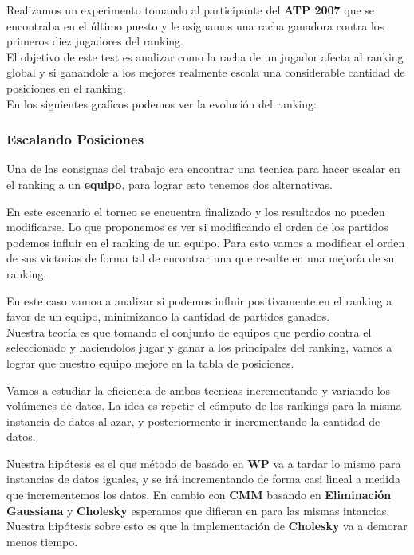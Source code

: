 Realizamos un experimento tomando al participante del \textbf{ATP 2007} que se encontraba en el último puesto y le asignamos una racha ganadora contra los primeros diez jugadores del ranking. \\

El objetivo de este test es analizar como la racha de un jugador afecta al ranking global y si ganandole a los mejores realmente escala una considerable cantidad de posiciones en el ranking. \\

En los siguientes graficos podemos ver la evolución del ranking: \\



\subsubsection{Escalando Posiciones}

Una de las consignas del trabajo era encontrar una tecnica para hacer escalar en el ranking a un \textbf{equipo}, para lograr esto tenemos dos alternativas. \\



En este escenario el torneo se encuentra finalizado y los resultados no pueden modificarse. Lo que proponemos es ver si modificando el orden de los partidos podemos influir en el ranking de un equipo. Para esto vamos a modificar el orden de sus victorias de forma tal de encontrar una que resulte en una mejoría de su ranking. \\



En este caso vamoa a analizar si podemos influir positivamente en el ranking a favor de un equipo, minimizando la cantidad de partidos ganados. \\

Nuestra teoría es que tomando el conjunto de equipos que perdio contra el seleccionado y haciendolos jugar y ganar a los principales del ranking, vamos a lograr que nuestro equipo mejore en la tabla de posiciones. \\





Vamos a estudiar la eficiencia de ambas tecnicas incrementando y variando los volúmenes de datos. La idea es repetir el cómputo de los rankings para la misma instancia de datos al azar, y posteriormente ir incrementando la cantidad de datos.

Nuestra hipótesis es el que método de basado en \textbf{WP} va a tardar lo mismo para instancias de datos iguales, y se irá incrementando de forma casi lineal a medida que incrementemos los datos. En cambio con \textbf{CMM} basando en \textbf{Eliminación Gaussiana} y \textbf{Cholesky} esperamos que difieran en para las mismas intancias. Nuestra hipótesis sobre esto es que la implementación de \textbf{Cholesky} va a demorar menos tiempo.


 





